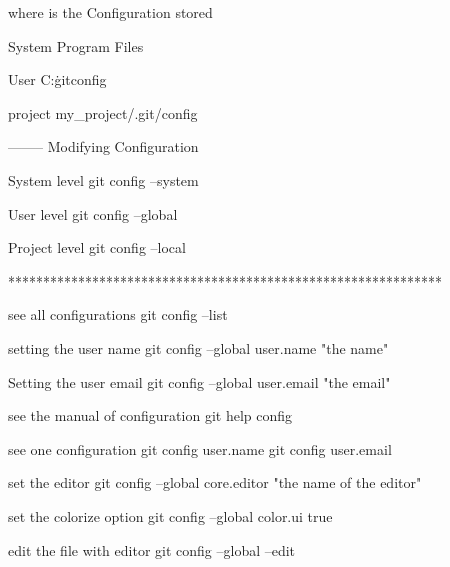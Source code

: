 where is the Configuration stored 

System 
  Program Files\Git\etc\gitconfig 

User 
  C:\Users\pc\.gitconfig

project 
my_project/.git/config 

-------- Modifying  Configuration 

System level
  git config --system 

User level
  git config --global 

Project level
  git config --local

**************************************************************

see all configurations 
  git config --list 


setting the user name 
  git config --global user.name "the name"

Setting the user email
  git config --global user.email "the email" 

see the manual of configuration 
  git help config 

see one configuration 
  git config user.name 
  git config user.email  


set the editor 
  git config --global core.editor "the name of the editor"

set the colorize option 
  git config --global color.ui true 

edit the file with editor 
  git config --global --edit 